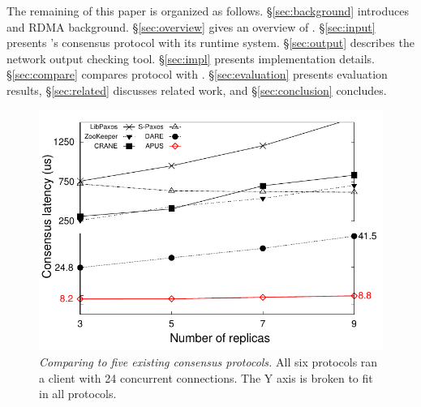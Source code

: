 The remaining of this paper is organized as follows.
\S\ref{sec:background} introduces \paxos and RDMA background.
\S\ref{sec:overview} gives an overview of \xxx. \S\ref{sec:input} presents 
\xxx's consensus protocol with its runtime system. \S\ref{sec:output} describes 
the network output checking tool. \S\ref{sec:impl} presents implementation 
details. \S\ref{sec:compare} compares \xxx protocol with \dare. 
\S\ref{sec:evaluation} presents evaluation results, 
\S\ref{sec:related} discusses related work, and \S\ref{sec:conclusion} 
concludes. 

\begin{figure}[t]
\centering
\vspace{-.10in}
\includegraphics[width=.48\textwidth]{figures/traditional_paxos_latency}
\vspace{-.1in}
\caption{{\em Comparing \xxx to five existing consensus protocols.} All 
six protocols ran a client with 24 concurrent connections. The Y axis is 
broken to fit in all protocols.}
\label{fig:scalability}
\vspace{-.3in}
\end{figure}
